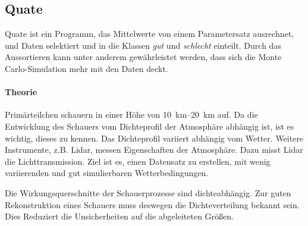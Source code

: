 \subsection{Quate}%
\label{sub:quate}

Quate ist ein Programm,
das Mittelwerte von einem Parametersatz ausrechnet,
und Daten selektiert und in die Klassen \textit{gut} und \textit{schlecht} einteilt.
Durch das Aussortieren kann unter anderem gewährleistet werden,
dass sich die Monte Carlo-Simulation mehr mit den Daten deckt.

\paragraph{Theorie}%
Primärteilchen schauern in einer Höhe von \SIrange{10}{20}{\kilo\meter}
auf.
Da die Entwicklung des Schauers vom Dichteprofil der Atmosphäre abhängig ist,
ist es wichtig, dieses zu kennen.
Das Dichteprofil variiert abhängig vom Wetter.
Weitere Instrumente, z.B. Lidar, messen Eigenschaften der Atmosphäre.
Dazu misst Lidar die Lichttransmission.
Ziel ist es, einen Datensatz zu erstellen,
mit wenig variierenden und gut simulierbaren Wetterbedingungen.

Die Wirkungsquerschnitte der Schauerprozesse sind dichteabhängig.
Zur guten Rekonstruktion eines Schauers muss deswegen die Dichteverteilung
bekannt sein.
Dies Reduziert die Unsicherheiten auf die abgeleiteten Größen.



